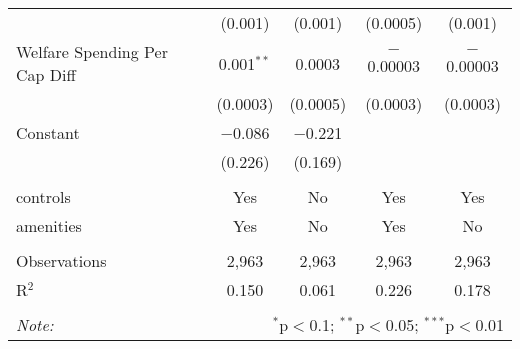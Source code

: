 \begin{table}[!htbp]
\begin{tabular}{@{\extracolsep{5pt}}lcccc}
  & (0.001) & (0.001) & (0.0005) & (0.001) \\ 
  Welfare Spending Per Cap Diff & 0.001$^{**}$ & 0.0003 & $-$0.00003 & $-$0.00003 \\ 
  & (0.0003) & (0.0005) & (0.0003) & (0.0003) \\ 
  Constant & $-$0.086 & $-$0.221 &  &  \\ 
  & (0.226) & (0.169) &  &  \\ 
 \hline \\[-1.8ex] 
controls & Yes & No & Yes & Yes \\ 
amenities & Yes & No & Yes & No \\ 
\hline \\[-1.8ex] 
Observations & 2,963 & 2,963 & 2,963 & 2,963 \\ 
R$^{2}$ & 0.150 & 0.061 & 0.226 & 0.178 \\ 
\hline 
\hline \\[-1.8ex] 
\textit{Note:}  & \multicolumn{4}{r}{$^{*}$p$<$0.1; $^{**}$p$<$0.05; $^{***}$p$<$0.01} \\ 
\end{tabular} 
\end{table} 
